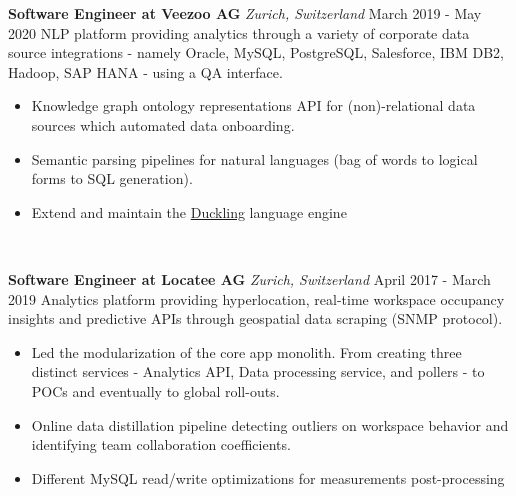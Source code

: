 \documentclass{article}
\begin{document}
        \begin{flushleft}
	   \textbf{\large Software Engineer at Veezoo AG} \textit{\footnotesize Zurich, Switzerland} \hfill \small March 2019 - May 2020   \newline
		NLP platform providing analytics through a variety of corporate data source integrations - namely Oracle, MySQL, PostgreSQL, Salesforce, IBM DB2, Hadoop, SAP HANA - using a QA interface.
            \newline
            \begin{itemize}
                \item Knowledge graph ontology representations API for (non)-relational data sources which automated data onboarding.
                \item Semantic parsing pipelines for natural languages (bag of words to logical forms to SQL generation).
                \item Extend and maintain the \href{https://github.com/facebook/duckling}{Duckling} language engine
            \end{itemize}
		          \\ [1ex] 
        \end{flushleft}

        \begin{flushleft}
            \textbf{\large Software Engineer at Locatee AG} \textit{\footnotesize Zurich, Switzerland} \hfill \small April 2017 - March 2019  \newline 
		Analytics platform providing hyperlocation, real-time workspace occupancy insights and predictive APIs through geospatial data scraping (SNMP protocol). 
            \newline
            \begin{itemize}
                \item Led the modularization of the core app monolith. From creating three distinct services - Analytics API, Data processing service, and pollers - to POCs and eventually to global roll-outs.
                \item Online data distillation pipeline detecting outliers on workspace behavior and identifying team collaboration coefficients.
                \item Different MySQL read/write optimizations for measurements post-processing
            \end{itemize}
		                \\ [1ex]
        \end{flushleft}
\end{document}
